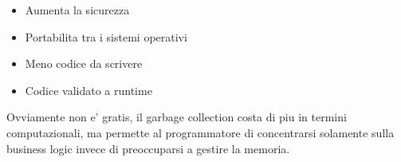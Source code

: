 \begin{itemize}
    \item Aumenta la sicurezza
    \item Portabilita tra i sistemi operativi
    \item Meno codice da scrivere
    \item Codice validato a runtime
\end{itemize}

Ovviamente non e' gratis, il garbage collection costa di piu in termini computazionali, ma permette al programmatore di concentrarsi solamente sulla business logic invece di preoccuparsi a gestire la memoria.
